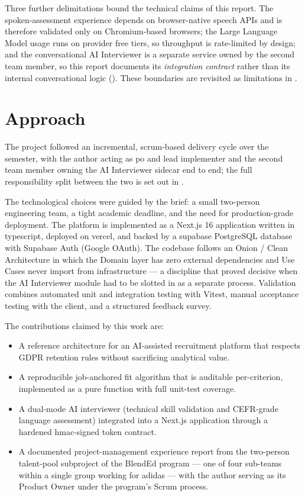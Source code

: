 Three further delimitations bound the technical claims of this report. The
spoken-assessment experience depends on browser-native speech APIs and is
therefore validated only on Chromium-based browsers; the Large Language Model
usage runs on provider free tiers, so throughput is rate-limited by design;
and the conversational AI Interviewer is a separate service owned by the
second team member, so this report documents its \emph{integration contract}
rather than its internal conversational logic
(). These boundaries are revisited as limitations in
.


\section{Approach}
\label{sec:approach}

The project followed an incremental, \gls{scrum}-based delivery cycle over the
semester, with the author acting as \gls{po} and lead implementer and the
second team member owning the AI Interviewer sidecar end to end; the full
responsibility split between the two is set out in .

The technological choices were guided by the brief: a small two-person
engineering team, a tight academic deadline, and the need for production-grade
deployment. The platform is implemented as a Next.js 16 application
written in \gls{typescript}, deployed on \gls{vercel}, and backed by a \gls{supabase}
PostgreSQL database with Supabase Auth (Google OAuth). The codebase
follows an Onion / Clean Architecture in which the Domain
layer has zero external dependencies and Use Cases never import from
infrastructure --- a discipline that proved decisive when the AI
Interviewer module had to be slotted in as a separate process. Validation
combines automated unit and integration testing with Vitest, manual
acceptance testing with the client, and a structured feedback survey.

The contributions claimed by this work are:

\begin{itemize}
	\item A reference architecture for an AI-assisted recruitment platform
	that respects GDPR retention rules without sacrificing analytical
	value.
	\item A reproducible job-anchored fit algorithm that is auditable
	per-criterion, implemented as a pure function with full unit-test
	coverage.
	\item A dual-mode AI interviewer (technical skill validation and
	CEFR-grade language assessment) integrated into a Next.js application
	through a hardened \gls{hmac}-signed token contract.
	\item A documented project-management experience report from the
	two-person talent-pool subproject of the BlendEd program --- one of
	four sub-teams within a single group working for adidas --- with
	the author serving as its Product Owner under the program's Scrum
	process.
\end{itemize}

